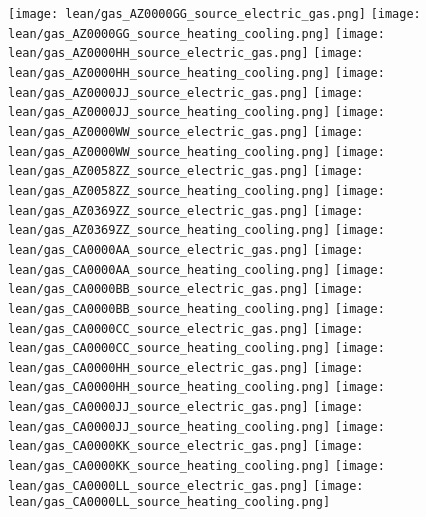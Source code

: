\texttt{[image: lean/gas\_AZ0000GG\_source\_electric\_gas.png]}
\texttt{[image: lean/gas\_AZ0000GG\_source\_heating\_cooling.png]}
\texttt{[image: lean/gas\_AZ0000HH\_source\_electric\_gas.png]}
\texttt{[image: lean/gas\_AZ0000HH\_source\_heating\_cooling.png]}
\texttt{[image: lean/gas\_AZ0000JJ\_source\_electric\_gas.png]}
\texttt{[image: lean/gas\_AZ0000JJ\_source\_heating\_cooling.png]}
\texttt{[image: lean/gas\_AZ0000WW\_source\_electric\_gas.png]}
\texttt{[image: lean/gas\_AZ0000WW\_source\_heating\_cooling.png]}
\texttt{[image: lean/gas\_AZ0058ZZ\_source\_electric\_gas.png]}
\texttt{[image: lean/gas\_AZ0058ZZ\_source\_heating\_cooling.png]}
\texttt{[image: lean/gas\_AZ0369ZZ\_source\_electric\_gas.png]}
\texttt{[image: lean/gas\_AZ0369ZZ\_source\_heating\_cooling.png]}
\texttt{[image: lean/gas\_CA0000AA\_source\_electric\_gas.png]}
\texttt{[image: lean/gas\_CA0000AA\_source\_heating\_cooling.png]}
\texttt{[image: lean/gas\_CA0000BB\_source\_electric\_gas.png]}
\texttt{[image: lean/gas\_CA0000BB\_source\_heating\_cooling.png]}
\texttt{[image: lean/gas\_CA0000CC\_source\_electric\_gas.png]}
\texttt{[image: lean/gas\_CA0000CC\_source\_heating\_cooling.png]}
\texttt{[image: lean/gas\_CA0000HH\_source\_electric\_gas.png]}
\texttt{[image: lean/gas\_CA0000HH\_source\_heating\_cooling.png]}
\texttt{[image: lean/gas\_CA0000JJ\_source\_electric\_gas.png]}
\texttt{[image: lean/gas\_CA0000JJ\_source\_heating\_cooling.png]}
\texttt{[image: lean/gas\_CA0000KK\_source\_electric\_gas.png]}
\texttt{[image: lean/gas\_CA0000KK\_source\_heating\_cooling.png]}
\texttt{[image: lean/gas\_CA0000LL\_source\_electric\_gas.png]}
\texttt{[image: lean/gas\_CA0000LL\_source\_heating\_cooling.png]}
